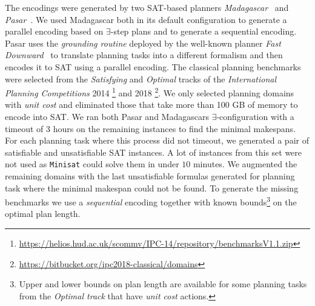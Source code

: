 \documentclass{elsarticle}
\newcommand{\solver}[1]{\texttt{#1}}
\begin{document}
The encodings were generated by two SAT-based planners
\emph{Madagascar}~\cite{Madagascar14} and \emph{Pasar}~\cite{Pasar19}. We used
Madagascar both in its default configuration to generate a parallel encoding
based on $\exists$-step plans and to generate a sequential encoding. Pasar uses
the \emph{grounding routine} deployed by the well-known planner \emph{Fast
  Downward}~\cite{FastDownward06} to translate planning tasks into a different
formalism and then encodes it to SAT using a parallel encoding.
The classical planning benchmarks were selected from the \emph{Satisfying} and
\emph{Optimal} tracks of the \emph{International Planning Competitions} 2014
\footnote{\url{https://helios.hud.ac.uk/scommv/IPC-14/repository/benchmarksV1.1.zip}}
and 2018 \footnote{\url{https://bitbucket.org/ipc2018-classical/domains}}. We
only selected planning domains with \emph{unit cost} and eliminated those that
take more than 100 GB of memory to encode into SAT. We ran both Pasar and
Madagascars $\exists$-configuration with a timeout of 3 hours on the
remaining instances to find the minimal makespans. For each planning task where
this process did not timeout, we generated a pair of satisfiable and
unsatisfiable SAT instances. A lot of instances from this set were not used
as \solver{Minisat} could solve them in under $10$ minutes.
We augmented the remaining domains with the last unsatisfiable formulas
generated for planning task where the minimal makespan could not be found.
To generate the missing benchmarks we use a \emph{sequential} encoding
together with known bounds\footnote{Upper and lower bounds on plan length are available for
	some planning tasks from the \emph{Optimal track} that have \emph{unit cost}
	actions.} on the optimal plan length.
\end{document}
